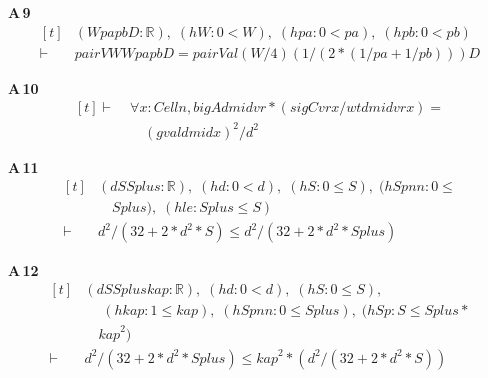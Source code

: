 \noindent\textbf{A\,9}\quad{}
{\footnotesize\[ \begin{aligned}[t]
&(\mathit{W} \mathit{pa} \mathit{pb} \mathit{D} : \mathbb{R} ),\; (\mathit{hW} : 0 < \mathit{W}),\; (\mathit{hpa} : 0 < \mathit{pa}),\; (\mathit{hpb} : 0 < \mathit{pb})\\
\vdash\;&\mathit{pairV} \mathit{W} \mathit{W} \mathit{pa} \mathit{pb} \mathit{D} = \mathit{pairVal} (\mathit{W} / 4) (1 / (2 * (1 / \mathit{pa} + 1 / \mathit{pb}))) \mathit{D}
\end{aligned} \]}

\noindent\textbf{A\,10}\quad{}
{\footnotesize\[ \begin{aligned}[t]
\vdash\;&\forall \mathit{x} : \mathit{Cell} \mathit{n}, \mathit{bigA} \mathit{d} \mathit{mid} \mathit{vr} * (\mathit{sigC} \mathit{vr} \mathit{x} / \mathit{wt} \mathit{d} \mathit{mid} \mathit{vr} \mathit{x}) =\\
&\quad (\mathit{gval} \mathit{d} \mathit{mid} \mathit{x}) ^{2} / \mathit{d} ^{2}
\end{aligned} \]}

\noindent\textbf{A\,11}\quad{}
{\footnotesize\[ \begin{aligned}[t]
&(\mathit{d} \mathit{S} \mathit{Splus} : \mathbb{R} ),\; (\mathit{hd} : 0 < \mathit{d}),\; (\mathit{hS} : 0 \leq \mathit{S}),\; (\mathit{hSpnn} : 0 \leq\\
&\quad \mathit{Splus}),\; (\mathit{hle} : \mathit{Splus} \leq \mathit{S})\\
\vdash\;&\mathit{d} ^{2} / (32 + 2 * \mathit{d} ^{2} * \mathit{S}) \leq \mathit{d} ^{2} / (32 + 2 * \mathit{d} ^{2} * \mathit{Splus})
\end{aligned} \]}

\noindent\textbf{A\,12}\quad{}
{\footnotesize\[ \begin{aligned}[t]
&(\mathit{d} \mathit{S} \mathit{Splus} \mathit{kap} : \mathbb{R} ),\; (\mathit{hd} : 0 < \mathit{d}),\; (\mathit{hS} : 0 \leq \mathit{S}),\\
&\quad \; (\mathit{hkap} : 1 \leq \mathit{kap}),\; (\mathit{hSpnn} : 0 \leq \mathit{Splus}),\; (\mathit{hSp} : \mathit{S} \leq \mathit{Splus} *\\
&\quad \mathit{kap} ^{2})\\
\vdash\;&\mathit{d} ^{2} / (32 + 2 * \mathit{d} ^{2} * \mathit{Splus}) \leq \mathit{kap} ^{2} * (\mathit{d} ^{2} / (32 + 2 * \mathit{d} ^{2} * \mathit{S}))
\end{aligned} \]}

